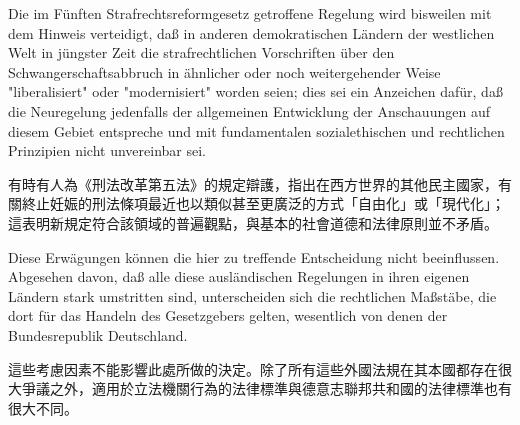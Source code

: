 \documentclass[12pt]{article}
\begin{document}
\syncleft
\begin{sourcepara}
Die im Fünften Strafrechtsreformgesetz getroffene Regelung wird bisweilen mit dem Hinweis verteidigt, daß in anderen demokratischen Ländern der westlichen Welt in jüngster Zeit die strafrechtlichen Vorschriften über den Schwangerschaftsabbruch in ähnlicher oder noch weitergehender Weise "liberalisiert" oder "modernisiert" worden seien; dies sei ein Anzeichen dafür, daß die Neuregelung jedenfalls der allgemeinen Entwicklung der Anschauungen auf diesem Gebiet entspreche und mit fundamentalen sozialethischen und rechtlichen Prinzipien nicht unvereinbar sei.
\end{sourcepara}
\begin{transpara}
有時有人為《刑法改革第五法》的規定辯護，指出在西方世界的其他民主國家，有關終止妊娠的刑法條項最近也以類似甚至更廣泛的方式「自由化」或「現代化」；這表明新規定符合該領域的普遍觀點，與基本的社會道德和法律原則並不矛盾。
\end{transpara}

\syncleft
\begin{sourcepara}
Diese Erwägungen können die hier zu treffende Entscheidung nicht beeinflussen. Abgesehen davon, daß alle diese ausländischen Regelungen in ihren eigenen Ländern stark umstritten sind, unterscheiden sich die rechtlichen Maßstäbe, die dort für das Handeln des Gesetzgebers gelten, wesentlich von denen der Bundesrepublik Deutschland.
\end{sourcepara}
\begin{transpara}
這些考慮因素不能影響此處所做的決定。除了所有這些外國法規在其本國都存在很大爭議之外，適用於立法機關行為的法律標準與德意志聯邦共和國的法律標準也有很大不同。
\end{transpara}
\end{document}
